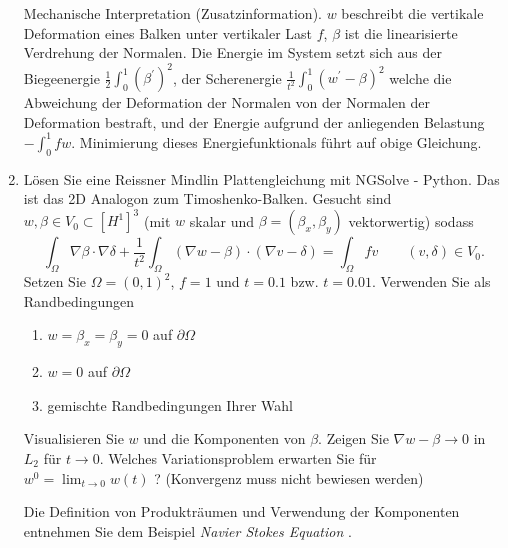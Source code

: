 \documentclass[11pt,a4paper]{report}
\begin{document}
\begin{enumerate}
Mechanische Interpretation (Zusatzinformation). $w$ beschreibt die
vertikale Deformation eines Balken unter vertikaler Last $f$, $\beta$
ist die linearisierte Verdrehung der Normalen. Die Energie im System
setzt sich aus der Biegeenergie $\frac{1}{2} \int_0^1 (\beta^\prime)^2$,
der Scherenergie $\frac{1}{t^2} \int_0^1 (w^\prime - \beta)^2$ welche die
Abweichung der Deformation der Normalen von der Normalen der
Deformation bestraft, und der Energie aufgrund der anliegenden
Belastung $-\int_0^1 f w$. Minimierung dieses Energiefunktionals f\"uhrt
auf obige Gleichung.

\item L\"osen Sie eine Reissner Mindlin Plattengleichung mit NGSolve -
  Python. Das ist das 2D Analogon zum Timoshenko-Balken.
Gesucht sind $w, \beta \in V_0 \subset [H^1]^3$ (mit $w$
  skalar und $\beta = (\beta_x, \beta_y)$ vektorwertig) sodass
$$
\int_\Omega \nabla \beta \cdot \nabla \delta + \frac{1}{t^2}
\int_\Omega (\nabla w - \beta) \cdot (\nabla v - \delta) = 
\int_\Omega f v  \qquad (v, \delta) \in V_0.
$$
Setzen Sie $\Omega = (0,1)^2$, $f = 1$ und $t = 0.1$ bzw. $t = 0.01$.
Verwenden Sie als Randbedingungen 
\begin{enumerate}
\item $w = \beta_x = \beta_y = 0$ auf $\partial \Omega$
\item $w = 0$  auf $\partial \Omega$
\item gemischte Randbedingungen Ihrer Wahl
\end{enumerate}
Visualisieren Sie $w$ und die Komponenten von $\beta$. Zeigen Sie
$\nabla w - \beta \rightarrow 0$ in $L_2$ f\"ur $t \rightarrow 0$. \newline
Welches Variationsproblem erwarten Sie f\"ur $w^0 = \lim_{t
    \rightarrow 0} w(t)$ ? (Konvergenz muss nicht bewiesen werden)

Die Definition von Produktr\"aumen und Verwendung der Komponenten
entnehmen Sie dem Beispiel {\it Navier Stokes Equation }.
\end{enumerate}
\end{document}
